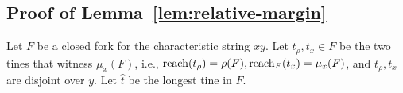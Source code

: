 




\subsection{Proof of Lemma~\ref{lem:relative-margin}}

Let $F$ be a closed fork for the characteristic string $xy$. 
Let $t_\rho, t_x \in F$ be the two tines that witness $\mu_x(F)$, 
i.e., $\operatorname{reach}(t_\rho) = \rho(F), \operatorname{reach}_F(t_x) = \mu_x(F)$, 
and $t_\rho, t_x$ are disjoint over $y$. 
Let $\hat{t}$ be the longest tine in $F$.

